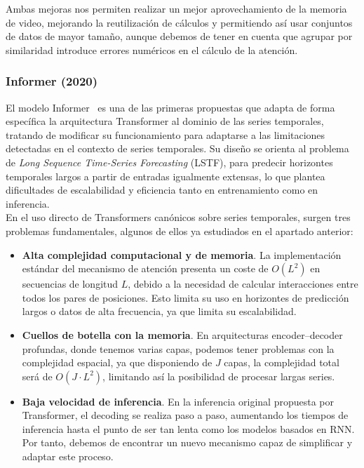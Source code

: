 Ambas mejoras nos permiten realizar un mejor aprovechamiento de la memoria de video, mejorando la reutilización de cálculos y permitiendo así usar conjuntos de datos de mayor tamaño, aunque debemos de tener en cuenta que agrupar por similaridad introduce errores numéricos en el cálculo de la atención.

\subsubsection{Informer (2020)}

El modelo Informer~\cite{zhou2021informerefficienttransformerlong} es una de las primeras propuestas que adapta de forma específica la arquitectura Transformer al dominio de las series temporales, tratando de modificar su funcionamiento para adaptarse a las limitaciones detectadas en el contexto de series temporales. Su diseño se orienta al problema de \textit{Long Sequence Time-Series Forecasting} (LSTF), para predecir horizontes temporales largos a partir de entradas igualmente extensas, lo que plantea dificultades de escalabilidad y eficiencia tanto en entrenamiento como en inferencia.\\

En el uso directo de Transformers canónicos sobre series temporales, surgen tres problemas fundamentales, algunos de ellos ya estudiados en el apartado anterior:

\begin{itemize}
    \item \textbf{Alta complejidad computacional y de memoria}. La implementación estándar del mecanismo de atención presenta un coste de $O(L^2)$ en secuencias de longitud $L$, debido a la necesidad de calcular interacciones entre todos los pares de posiciones. Esto limita su uso en horizontes de predicción largos o datos de alta frecuencia, ya que limita su escalabilidad.
    \item \textbf{Cuellos de botella con la memoria}. En arquitecturas encoder–decoder profundas, donde tenemos varias capas, podemos tener problemas con la complejidad espacial, ya que disponiendo de $J$ capas, la complejidad total será de $O(J \cdot L^2)$, limitando así la posibilidad de procesar largas series.
    \item \textbf{Baja velocidad de inferencia}. En la inferencia original propuesta por Transformer, el decoding se realiza paso a paso, aumentando los tiempos de inferencia hasta el punto de ser tan lenta como los modelos basados en RNN. Por tanto, debemos de encontrar un nuevo mecanismo capaz de simplificar y adaptar este proceso.
\end{itemize}

